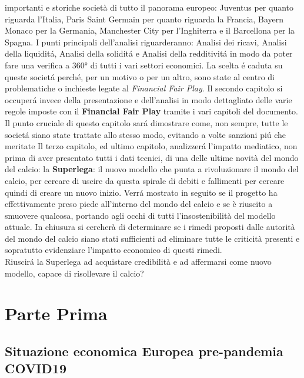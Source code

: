 \documentclass[
    corpo=12pt,
    oneside,
    evenboxes,
    tipotesi=triennale,
    stile=classica,
    oldstyle,
    autoretitolo,
    greek,
]{toptesi}
\begin{document}
\begin{interlinea}{1.5}
importanti e storiche societ\`a di tutto il panorama europeo: Juventus per quanto riguarda l'Italia, Paris Saint Germain per quanto riguarda la 
Francia, Bayern Monaco per la Germania, Manchester City per l'Inghiterra e il Barcellona per la Spagna. I punti principali dell'analisi riguarderanno: 
Analisi dei ricavi, Analisi della liquidit\'a, Analisi della solidit\'a e Analisi della redditivit\'a in modo da 
poter fare una verifica a 360° di tutti i vari settori economici. La scelta \'e caduta su queste societ\'a perch\'e, per un motivo o per un altro, sono state 
al centro di problematiche o inchieste legate al \emph{Financial Fair Play}.\newline
Il secondo capitolo si occuper\'a invece della presentazione e dell'analisi in modo dettagliato delle varie regole imposte con il
\textbf{Financial Fair Play} tramite i vari capitoli del documento. Il punto cruciale di questo capitolo sar\'a dimostrare come, non sempre, 
tutte le societ\'a siano state trattate allo stesso modo, evitando a volte sanzioni pi\'u che meritate\newline
Il terzo capitolo, ed ultimo capitolo, analizzer\'a l'impatto mediatico, non prima di aver presentato tutti i dati tecnici, di una delle ultime novità 
del mondo del calcio: la \textbf{Superlega}: il nuovo modello che punta a rivoluzionare il mondo del calcio, per cercare di uscire da questa spirale di debiti
e fallimenti per cercare quindi di creare un nuovo inizio. Verr\'a mostrato in seguito se il progetto ha effettivamente preso piede all'interno del mondo del calcio 
e se è riuscito a smuovere qualcosa, portando agli occhi di tutti l'insostenibilità del modello attuale.\newline
In chiusura si cercherà di determinare se i rimedi proposti dalle autorità del mondo del calcio siano stati sufficienti ad eliminare tutte le criticità presenti e 
sopratutto evidenziare l'impatto economico di questi rimedi.\\
Riuscir\'a la Superlega ad acquistare credibilità e ad affermarsi come nuovo modello, capace di risollevare il calcio?

\part{Parte Prima}
\chapter{Situazione economica Europea pre-pandemia COVID19}

\end{interlinea}
\end{document}
